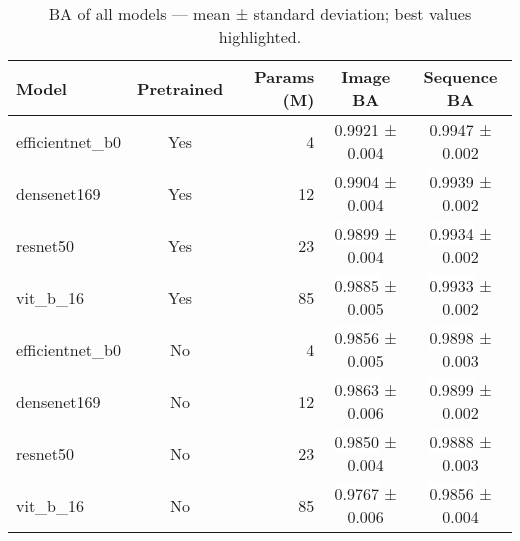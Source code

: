 \begin{table}[H]
\centering
\caption{\acs{BA} of all models --- mean ± standard deviation; best values highlighted.}
\label{tab:bal_acc_by_model}
\begin{tabular}{l c r c c}
\toprule
Model & Pretrained & Params (M) & Image \acs{BA} & Sequence \acs{BA} \\
\midrule
efficientnet\_b0 & Yes & 4 & \colorbox{gray!20}{0.9921} ± 0.004 & \colorbox{gray!20}{0.9947} ± 0.002 \\
densenet169 & Yes & 12 & \colorbox{white}{0.9904} ± 0.004 & \colorbox{white}{0.9939} ± 0.002 \\
resnet50 & Yes & 23 & \colorbox{white}{0.9899} ± 0.004 & \colorbox{white}{0.9934} ± 0.002 \\
vit\_b\_16 & Yes & 85 & \colorbox{white}{0.9885} ± 0.005 & \colorbox{white}{0.9933} ± 0.002 \\
\midrule
efficientnet\_b0 & No & 4 & \colorbox{white}{0.9856} ± 0.005 & \colorbox{white}{0.9898} ± 0.003 \\
densenet169 & No & 12 & \colorbox{white}{0.9863} ± 0.006 & \colorbox{white}{0.9899} ± 0.002 \\
resnet50 & No & 23 & \colorbox{white}{0.9850} ± 0.004 & \colorbox{white}{0.9888} ± 0.003 \\
vit\_b\_16 & No & 85 & \colorbox{white}{0.9767} ± 0.006 & \colorbox{white}{0.9856} ± 0.004 \\
\bottomrule
\end{tabular}
\end{table}